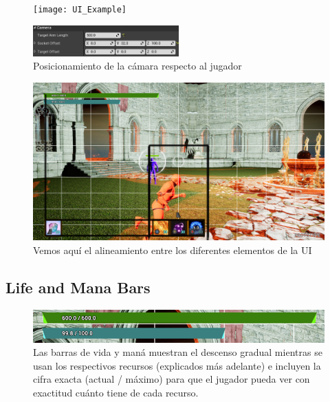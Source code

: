 \documentclass[12pt]{report}
\begin{document}
\begin{figure}[h]
    \centering
    \texttt{[image: UI\_Example]}
\end{figure}

\begin{figure}[h]
    \centering
    \includegraphics[width=0.5\textwidth]{camera_position_presets}
	\captionsetup{labelformat=empty}
    \caption{Posicionamiento de la cámara respecto al jugador}
\end{figure}

\begin{figure}[b]
    \centering
    \includegraphics[width=1\textwidth]{alignments}
	\captionsetup{labelformat=empty}
    \caption{Vemos aquí el alineamiento entre los diferentes elementos de la UI}
\end{figure}

\subsection{Life and Mana Bars}

\begin{figure}[H]
    \centering
    \includegraphics[width=1\textwidth]{life_mana_bars}
	\captionsetup{labelformat=empty}
    \caption{Las barras de vida y maná muestran el descenso gradual mientras se usan los respectivos recursos (explicados más adelante) e incluyen la cifra exacta (actual / máximo) para que el jugador pueda ver con exactitud cuánto tiene de cada recurso.}
\end{figure}
\end{document}
